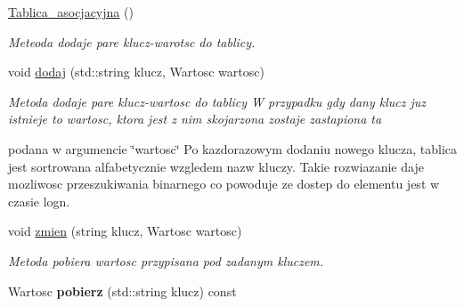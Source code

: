 \begin{DoxyCompactItemize}
\item 
\hyperlink{class_tablica__asocjacyjna_adc6a84da0c12ff6c483730ca87f2209e}{Tablica\-\_\-asocjacyjna} ()
\begin{DoxyCompactList}\small\item\em Meteoda dodaje pare klucz-\/warotsc do tablicy. \end{DoxyCompactList}\item 
void \hyperlink{class_tablica__asocjacyjna_a7eca8d386171766b0c8e2df6db8d3ac5}{dodaj} (std\-::string klucz, Wartosc wartosc)
\begin{DoxyCompactList}\small\item\em Metoda dodaje pare klucz-\/wartosc do tablicy W przypadku gdy dany klucz juz istnieje to wartosc, ktora jest z nim skojarzona zostaje zastapiona ta\par
 podana w argumencie \char`\"{}wartosc\char`\"{} Po kazdorazowym dodaniu nowego klucza, tablica jest sortrowana alfabetycznie wzgledem nazw kluczy. Takie rozwiazanie daje mozliwosc przeszukiwania binarnego co powoduje ze dostep do elementu jest w czasie logn. \end{DoxyCompactList}\item 
void \hyperlink{class_tablica__asocjacyjna_a2ff35eaf60d462d5ddf0cb28e70a89c9}{zmien} (string klucz, Wartosc wartosc)
\begin{DoxyCompactList}\small\item\em Metoda pobiera wartosc przypisana pod zadanym kluczem. \end{DoxyCompactList}\item 
\hypertarget{class_tablica__asocjacyjna_a54e532c718b6f7b5d2a0ffe4b2d6c496}{Wartosc {\bfseries pobierz} (std\-::string klucz) const }\label{class_tablica__asocjacyjna_a54e532c718b6f7b5d2a0ffe4b2d6c496}


\end{DoxyCompactItemize}
